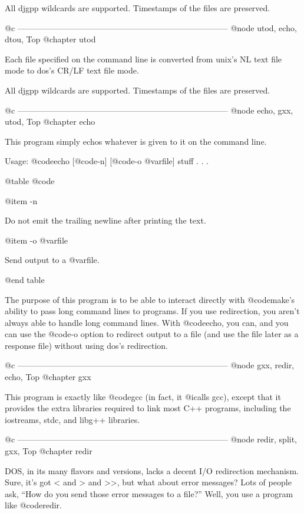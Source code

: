 All djgpp wildcards are supported.  Timestamps of the files are preserved.

@c -----------------------------------------------------------------------------
@node utod, echo, dtou, Top
@chapter utod

Each file specified on the command line is converted from unix's NL text
file mode to dos's CR/LF text file mode.

All djgpp wildcards are supported.  Timestamps of the files are preserved.

@c -----------------------------------------------------------------------------
@node echo, gxx, utod, Top
@chapter echo

This program simply echos whatever is given to it on the command line.

Usage: @code{echo} [@code{-n}] [@code{-o} @var{file}] stuff . . .

@table @code

@item -n

Do not emit the trailing newline after printing the text.

@item -o @var{file}

Send output to a @var{file}.

@end table

The purpose of this program is to be able to interact directly with
@code{make}'s ability to pass long command lines to programs.  If you
use redirection, you aren't always able to handle long command lines.
With @code{echo}, you can, and you can use the @code{-o} option to
redirect output to a file (and use the file later as a response file)
without using dos's redirection.

@c -----------------------------------------------------------------------------
@node gxx, redir, echo, Top
@chapter gxx

This program is exactly like @code{gcc} (in fact, it @i{calls} gcc), except
that it provides the extra libraries required to link most C++ programs,
including the iostreams, stdc, and libg++ libraries.

@c -----------------------------------------------------------------------------
@node    redir, split, gxx, Top
@chapter redir

DOS, in its many flavors and versions, lacks a decent I/O redirection
mechanism.  Sure, it's got < and > and >>, but what about error
messages?  Lots of people ask, ``How do you send those error messages
to a file?''  Well, you use a program like @code{redir}.


